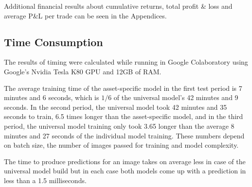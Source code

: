 \documentclass[12pt, a4paper]{article}
\begin{document}
Additional financial results about cumulative returns, total profit \& loss and average P\&L per trade can be seen in the Appendices.

\subsection{Time Consumption}
\label{subsec:ER:TimePerf}

The results of timing were calculated while running in Google Colaboratory using Google's Nvidia Tesla K80 GPU and 12GB of RAM.

The average training time of the asset-specific model in the first test period is 7 minutes and 6 seconds, which is $1/6$ of the universal model's 42 minutes and 9 seconds. 
In the second period, the universal model took 42 minutes and 35 seconds to train, 6.5 times longer than the asset-specific model, and in the third period, the universal model training only took 3.65 longer than the average 8 minutes and 27 seconds of the individual model training. These numbers depend on batch size, the number of images passed for training and model complexity.

The time to produce predictions for an image takes on average less in case of the universal model build but in each case both models come up with a prediction in less than a 1.5 milliseconds.
\end{document}
